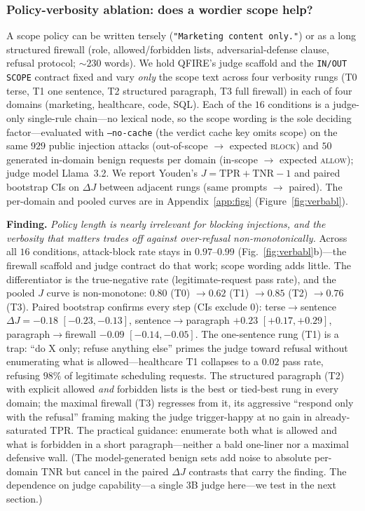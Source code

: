 \documentclass[11pt]{article}
\begin{document}
\subsubsection{Policy-verbosity ablation: does a wordier scope help?}\label{sec:verbabl}
A scope policy can be written tersely (\texttt{"Marketing content only."}) or as a
long structured firewall (role, allowed/forbidden lists, adversarial-defense
clause, refusal protocol; ${\sim}230$ words). We hold QFIRE's judge scaffold and
the \texttt{IN/OUT SCOPE} contract fixed and vary \emph{only} the scope text across
four verbosity rungs (T0 terse, T1 one sentence, T2 structured paragraph, T3 full
firewall) in each of four domains (marketing, healthcare, code, SQL). Each of the
$16$ conditions is a judge-only single-rule chain---no lexical node, so the scope
wording is the sole deciding factor---evaluated with \texttt{--no-cache} (the
verdict cache key omits scope) on the same $929$ public injection
attacks (out-of-scope $\rightarrow$ expected \textsc{block}) and $50$ generated
in-domain benign requests per domain (in-scope $\rightarrow$ expected
\textsc{allow}); judge model Llama~3.2. We report Youden's
$J = \mathrm{TPR} + \mathrm{TNR} - 1$ and paired bootstrap CIs on $\Delta J$
between adjacent rungs (same prompts $\rightarrow$ paired). The per-domain and
pooled curves are in Appendix~\ref{app:figs} (Figure~\ref{fig:verbabl}).

\medskip\noindent\textbf{Finding.} \emph{Policy length is nearly irrelevant for blocking
injections, and the verbosity that matters trades off against over-refusal
non-monotonically.} Across all $16$ conditions, attack-block rate stays in
$0.97$--$0.99$ (Fig.~\ref{fig:verbabl}b)---the firewall scaffold and judge contract
do that work; scope wording adds little. The differentiator is the true-negative
rate (legitimate-request pass rate), and the pooled $J$ curve is non-monotone:
$0.80$ (T0) $\rightarrow 0.62$ (T1) $\rightarrow 0.85$ (T2) $\rightarrow 0.76$ (T3).
Paired bootstrap confirms every step (CIs exclude $0$): terse$\rightarrow$sentence
$\Delta J = -0.18$ $[-0.23, -0.13]$, sentence$\rightarrow$paragraph
$+0.23$ $[+0.17, +0.29]$, paragraph$\rightarrow$firewall $-0.09$ $[-0.14, -0.05]$.
The one-sentence rung (T1) is a trap: ``do X only; refuse anything else'' primes the
judge toward refusal without enumerating what is allowed---healthcare T1 collapses
to a $0.02$ pass rate, refusing $98\%$ of legitimate scheduling requests. The
structured paragraph (T2) with explicit allowed \emph{and} forbidden lists is the
best or tied-best rung in every domain; the maximal firewall (T3) regresses from it,
its aggressive ``respond only with the refusal'' framing making the judge
trigger-happy at no gain in already-saturated TPR. The practical guidance:
enumerate both what is allowed and what is forbidden in a short paragraph---neither
a bald one-liner nor a maximal defensive wall. (The model-generated benign sets
add noise to absolute per-domain TNR but cancel in the paired $\Delta J$ contrasts
that carry the finding. The dependence on judge capability---a single $3$B judge
here---we test in the next section.)
\end{document}
